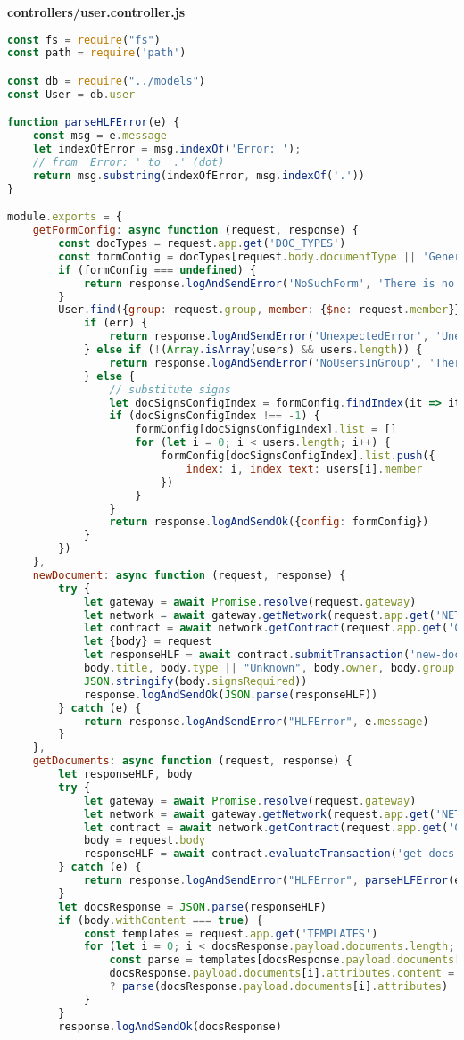 \textbf{controllers/user.controller.js}
\begin{lstlisting}[language=JavaScript]
const fs = require("fs")
const path = require('path')

const db = require("../models")
const User = db.user

function parseHLFError(e) {
	const msg = e.message
	let indexOfError = msg.indexOf('Error: ');
	// from 'Error: ' to '.' (dot)
	return msg.substring(indexOfError, msg.indexOf('.'))
}

module.exports = {
	getFormConfig: async function (request, response) {
		const docTypes = request.app.get('DOC_TYPES')
		const formConfig = docTypes[request.body.documentType || 'General']
		if (formConfig === undefined) {
			return response.logAndSendError('NoSuchForm', 'There is no form config for doc type ' + request.body.documentType + '.')
		}
		User.find({group: request.group, member: {$ne: request.member}}).exec((err, users) => {
			if (err) {
				return response.logAndSendError('UnexpectedError', 'Unexpected error, see middleware logs for details.')
			} else if (!(Array.isArray(users) && users.length)) {
				return response.logAndSendError('NoUsersInGroup', 'There are no any users in group ' + request.group + '.')
			} else {
				// substitute signs
				let docSignsConfigIndex = formConfig.findIndex(it => it._id === 'signs')
				if (docSignsConfigIndex !== -1) {
					formConfig[docSignsConfigIndex].list = []
					for (let i = 0; i < users.length; i++) {
						formConfig[docSignsConfigIndex].list.push({
							index: i, index_text: users[i].member
						})
					}
				}
				return response.logAndSendOk({config: formConfig})
			}
		})
	},
	newDocument: async function (request, response) {
		try {
			let gateway = await Promise.resolve(request.gateway)
			let network = await gateway.getNetwork(request.app.get('NETWORK_NAME'))
			let contract = await network.getContract(request.app.get('CONTRACT_ID'));
			let {body} = request
			let responseHLF = await contract.submitTransaction('new-doc',
			body.title, body.type || "Unknown", body.owner, body.group, JSON.stringify(body.attributes),
			JSON.stringify(body.signsRequired))
			response.logAndSendOk(JSON.parse(responseHLF))
		} catch (e) {
			return response.logAndSendError("HLFError", e.message)
		}
	},
	getDocuments: async function (request, response) {
		let responseHLF, body
		try {
			let gateway = await Promise.resolve(request.gateway)
			let network = await gateway.getNetwork(request.app.get('NETWORK_NAME'))
			let contract = await network.getContract(request.app.get('CONTRACT_ID'));
			body = request.body
			responseHLF = await contract.evaluateTransaction('get-docs', body.group)
		} catch (e) {
			return response.logAndSendError("HLFError", parseHLFError(e.message))
		}
		let docsResponse = JSON.parse(responseHLF)
		if (body.withContent === true) {
			const templates = request.app.get('TEMPLATES')
			for (let i = 0; i < docsResponse.payload.documents.length; i++) {
				const parse = templates[docsResponse.payload.documents[i].type]
				docsResponse.payload.documents[i].attributes.content = parse
				? parse(docsResponse.payload.documents[i].attributes) : null
			}
		}
		response.logAndSendOk(docsResponse)
		

\end{lstlisting}
